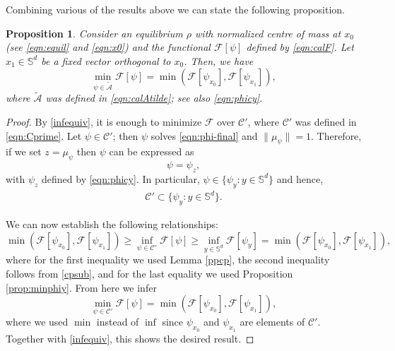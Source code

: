 \documentclass[11pt]{amsart}
\newtheorem{proposition}{Proposition}[section]
\newcommand{\bbs}{\mathbb S}
\newcommand{\calA}{\mathcal{A}}
\newcommand{\calC}{\mathcal{C}}
\newcommand{\calF}{\mathcal{F}}
\newcommand{\dm}{d} %
\begin{document}
Combining various of the results above we can state the following proposition.
\begin{proposition}
\label{prop:minF-tildeA} 
Consider an equilibrium $\rho$ with normalized centre of mass at $x_0$ (see \eqref{eqn:equil} and \eqref{eqn:x0}) and  the functional $\calF[\psi]$ defined by \eqref{eqn:calF}. Let $x_1 \in \bbs^\dm$ be a fixed vector orthogonal to $x_0$. Then, we have
\[
\min_{\psi\in\tilde{\mathcal{A}}}\mathcal{F}[\psi]=\min\left(\mathcal{F}[\psi_{x_0}], \mathcal{F}[\psi_{x_1}]\right),
\]
where $\tilde{\calA}$ was defined in \eqref{eqn:calAtilde}; see also \eqref{eqn:phicy}.
\end{proposition}
\begin{proof}
By \eqref{infequiv}, it is enough to minimize $\calF$ over $\calC'$, where $\calC'$ was defined in \eqref{eqn:Cprime}. Let $\psi\in\mathcal{C}'$; then $\psi$ solves \eqref{eqn:phi-final} and $\|\mu_\psi\|=1$. Therefore, if we set $z=\mu_\psi$ then $\psi$ can be expressed as
\[
\psi=\psi_z,
\]
with $\psi_z$ defined by \eqref{eqn:phicy}. In particular, $\psi\in\{\psi_y:y\in\bbs^\dm\}$ and hence,
\begin{align}\label{cpsub}
\mathcal{C}'\subset\{\psi_y:y\in\bbs^\dm\}.
\end{align}

We can now establish the following relationships:
\[
\min\left(\mathcal{F}[\psi_{x_0}], \mathcal{F}[\psi_{x_1}]\right)\geq\inf_{\psi \in\mathcal{C}'}\mathcal{F}[\psi]\geq\inf_{y\in\bbs^\dm}\mathcal{F}[\psi_y]=\min\left(\mathcal{F}[\psi_{x_0}], \mathcal{F}[\psi_{x_1}]\right),
\]
where for the first inequality we used Lemma \ref{ppcp}, the second inequality follows from \eqref{cpsub}, and for the last equality we used Proposition \ref{prop:minphiy}. From here we infer 
\[
\min_{\psi \in\mathcal{C}'}\mathcal{F}[\psi]=\min\left(\mathcal{F}[\psi_{x_0}], \mathcal{F}[\psi_{x_1}]\right),
\]
where we used $\min$ instead of $\inf$ since $\psi_{x_0}$ and $\psi_{x_1}$ are elements of $\mathcal{C}'$. Together with \eqref{infequiv}, this shows the desired result.
\end{proof}
\end{document}
